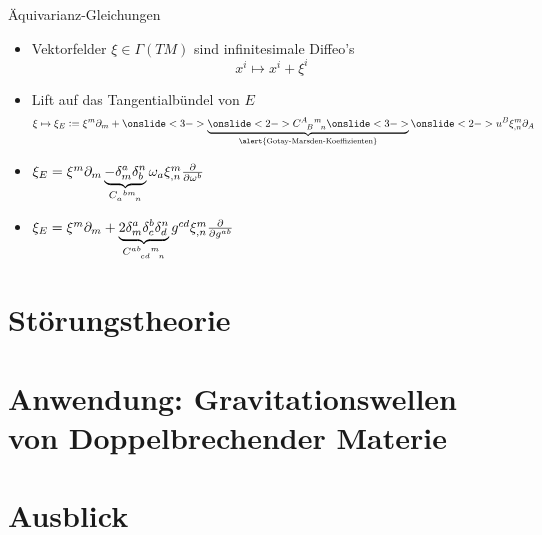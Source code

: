 \documentclass{beamer}
\newcommand{\gmc}[4]{\ensuremath{C^{#1\hphantom{#2}#3}_{\hphantom{#1}{#2}\hphantom{#3}#4}}}
\newcommand{\gmcd}[4]{\ensuremath{C_{#1\hphantom{#2#3}#4}^{\hphantom{#1}{#2}#3}}}
\begin{document}
    \begin{frame}{Äquivarianz-Gleichungen}
        \begin{itemize}
            \item<1-> Vektorfelder $\xi\in\Gamma(TM)$ sind infinitesimale Diffeo's \[ x^i \mapsto x^i + \xi^i \]
            \item<2-> Lift auf das Tangentialbündel von $E$ \[ \xi \mapsto \xi_E \vcentcolon= \xi^m\partial_m + \onslide<3-> \underbrace{\onslide<2-> \gmc{A}{B}{m}{n} \onslide<3-> }_{\mathclap{\text{\alert{Gotay-Marsden-Koeffizienten}}}} \onslide<2-> u^B \xi^m_{,n} \partial_A \]
            \item<4->  $\xi_E  =\xi^m \partial_m \underbrace{- \delta^a_m \delta^n_b}_{\gmcd{a}{b}{m}{n}} \omega_a \xi^m_{,n} \frac{\partial}{\partial \omega^b} $
            \item<5->  $\xi_E  =\xi^m \partial_m + \underbrace{2 \delta^a_m \delta^b_c \delta^n_d}_{\gmc{ab}{cd}{m}{n}} g^{cd} \xi^m_{,n} \frac{\partial}{\partial g^{ab}} $
        \end{itemize}
    \end{frame}


    \section{Störungstheorie}\label{sec:stoerungstheorie}


    \section{Anwendung: Gravitationswellen von Doppelbrechender Materie}\label{sec:anwendung}


    \section{Ausblick}\label{sec:ausblick}
\end{document}
